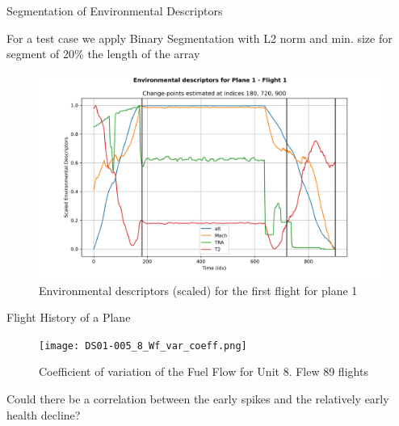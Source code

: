 \documentclass{beamer}
\begin{document}
        \begin{frame}{Segmentation of Environmental Descriptors}

            For a test case we apply Binary Segmentation with L2 norm and min. size for segment of 20\% the length of the array
            \begin{figure}
                \centering
                \includegraphics[scale=0.35]{environment_split_1_1.png}
                \caption{Environmental descriptors (scaled) for the first flight for plane 1}
            \end{figure}
        \end{frame}

        \begin{frame}{Flight History of a Plane}
            \begin{figure}
                \centering
                \texttt{[image: DS01-005\_8\_Wf\_var\_coeff.png]}
                \caption{Coefficient of variation of the Fuel Flow for Unit 8. Flew 89 flights}
            \end{figure}
            Could there be a correlation between the early spikes and the relatively early health decline?
        \end{frame}
\end{document}
